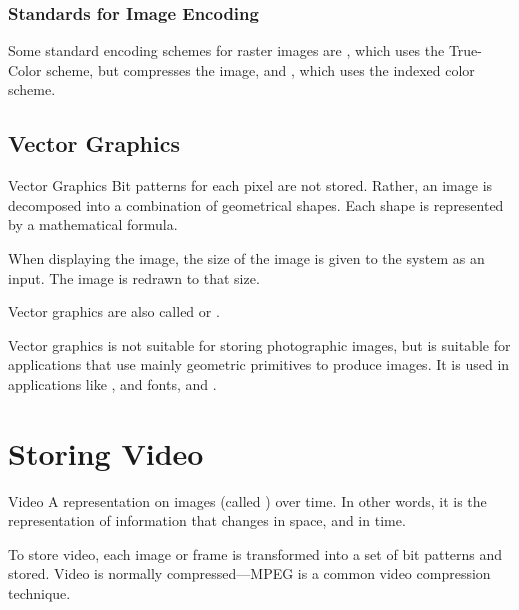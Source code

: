 \documentclass[\main/notes.tex]{subfiles}
\begin{document}
				\subsubsection{Standards for Image Encoding}
					Some standard encoding schemes for raster images are , which uses the True-Color scheme, but compresses the image, and , which uses the indexed color scheme.
			\subsection{Vector Graphics}
				\begin{definition}{Vector Graphics}
					Bit patterns for each pixel are not stored. Rather, an image is decomposed into a combination of geometrical shapes. Each shape is represented by a mathematical formula.
					\begin{indentparagraph}
						When displaying the image, the size of the image is given to the system as an input. The image is redrawn to that size. 
					\end{indentparagraph}
					\begin{indentparagraph}
						Vector graphics are also called  or .
					\end{indentparagraph}
				\end{definition}
				Vector graphics is not suitable for storing photographic images, but is suitable for applications that use mainly geometric primitives to produce images. It is used in applications like ,  and  fonts, and \concept{Computer-aided design (CAD)}.
		\section{Storing Video}
			\begin{definition}{Video}
				A representation on images (called ) over time. In other words, it is the representation of information that changes in space, and in time.
				\begin{indentparagraph}
					To store video, each image or frame is transformed into a set of bit patterns and stored. Video is normally compressed---MPEG is a common video compression technique.
				\end{indentparagraph}
			\end{definition}
\end{document}
